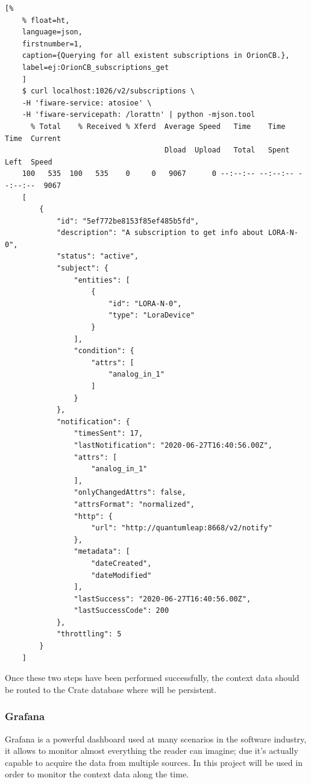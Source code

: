 \documentclass[11pt,a4paper,dvipsnames,twoside]{article}
\begin{document}
\begin{itemize}
  \begin{lstlisting}[%
    % float=ht,
    language=json,
    firstnumber=1,
    caption={Querying for all existent subscriptions in OrionCB.},
    label=ej:OrionCB_subscriptions_get
    ]
    $ curl localhost:1026/v2/subscriptions \
    -H 'fiware-service: atosioe' \
    -H 'fiware-servicepath: /lorattn' | python -mjson.tool
      % Total    % Received % Xferd  Average Speed   Time    Time     Time  Current
                                     Dload  Upload   Total   Spent    Left  Speed
    100   535  100   535    0     0   9067      0 --:--:-- --:--:-- --:--:--  9067
    [
        {
            "id": "5ef772be8153f85ef485b5fd",
            "description": "A subscription to get info about LORA-N-0",
            "status": "active",
            "subject": {
                "entities": [
                    {
                        "id": "LORA-N-0",
                        "type": "LoraDevice"
                    }
                ],
                "condition": {
                    "attrs": [
                        "analog_in_1"
                    ]
                }
            },
            "notification": {
                "timesSent": 17,
                "lastNotification": "2020-06-27T16:40:56.00Z",
                "attrs": [
                    "analog_in_1"
                ],
                "onlyChangedAttrs": false,
                "attrsFormat": "normalized",
                "http": {
                    "url": "http://quantumleap:8668/v2/notify"
                },
                "metadata": [
                    "dateCreated",
                    "dateModified"
                ],
                "lastSuccess": "2020-06-27T16:40:56.00Z",
                "lastSuccessCode": 200
            },
            "throttling": 5
        }
    ]

  \end{lstlisting}

\end{itemize}

Once these two steps have been performed successfully, the context data should be routed to the Crate database where will be persistent. 

\subsubsection{Grafana}
Grafana is a powerful dashboard used at many scenarios in the software industry, it allows to monitor almost everything the reader can imagine; due it's actually capable to acquire the data from multiple sources. In this project will be used in order to monitor the context data along the time.
\end{document}
